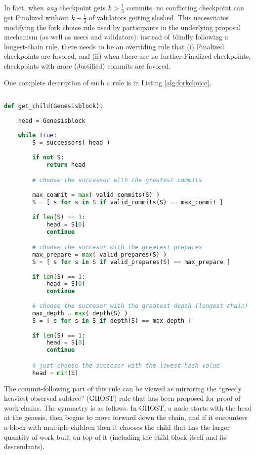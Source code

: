 \documentclass[12pt]{article}
\begin{document}
In fact, when \textit{any} checkpoint gets $k > \frac{1}{3}$ commits, no conflicting checkpoint can get Finalized without $k - \frac{1}{3}$ of validators getting slashed. This necessitates modifying the fork choice rule used by participants in the underlying proposal mechanism (as well as users and validators): instead of blindly following a longest-chain rule, there needs to be an overriding rule that (i) Finalized checkpoints are favored, and (ii) when there are no further Finalized checkpoints, checkpoints with more (Justified) commits are favored.

One complete description of such a rule is in Listing \ref{alg:forkchoice}.

\begin{lstlisting}[language=Python, caption={Algorithm for determining the head}, captionpos=b, label={alg:forkchoice}]

def get_child(Genesisblock):
    
    head = Genesisblock
    
    while True:
        S = successors( head )
        
        if not S:
            return head

        # choose the successor with the greatest commits
        
        max_commit = max( valid_commits(S) )        
        S = [ s for s in S if valid_commits(S) == max_commit ]
        
        if len(S) == 1:
            head = S[0]
            continue

        # choose the succesor with the greatest prepares
        max_prepare = max( valid_prepares(S) )
        S = [ s for s in S if valid_prepares(S) == max_prepare ]
        
        if len(S) == 1:
            head = S[0]
            continue
        
        # choose the succesor with the greatest depth (longest chain)
        max_depth = max( depth(S) )
        S = [ s for s in S if depth(S) == max_depth ]
        
        if len(S) == 1:
            head = S[0]
            continue

        # just choose the succesor with the lowest hash value
        head = min(S)    
\end{lstlisting}

The commit-following part of this rule can be viewed as mirroring the ``greedy heaviest observed subtree'' (GHOST) rule that has been proposed for proof of work chains\cite{sompolinsky2013accelerating}. The symmetry is as follows. In GHOST, a node starts with the head at the genesis, then begins to move forward down the chain, and if it encounters a block with multiple children then it chooses the child that has the larger quantity of work built on top of it (including the child block itself and its descendants).
\end{document}
